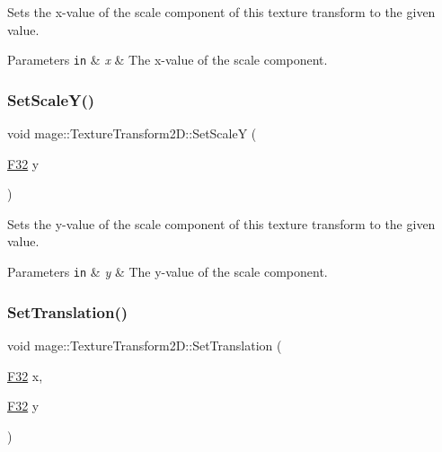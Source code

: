 Sets the x-\/value of the scale component of this texture transform to the given value.


\begin{DoxyParams}[1]{Parameters}
\mbox{\tt in}  & {\em x} & The x-\/value of the scale component. \\
\hline
\end{DoxyParams}
\mbox{\label{classmage_1_1_texture_transform2_d_a622785c804ceb47b59a399ec495ad41d}} 
\subsubsection{\texorpdfstring{Set\+Scale\+Y()}{SetScaleY()}}
{\footnotesize\ttfamily void mage\+::\+Texture\+Transform2\+D\+::\+Set\+ScaleY (\begin{DoxyParamCaption}\item[{\mbox{\hyperlink{namespacemage_aa97e833b45f06d60a0a9c4fc22ae02c0}{F32}}}]{y }\end{DoxyParamCaption})\hspace{0.3cm}{\ttfamily [noexcept]}}

Sets the y-\/value of the scale component of this texture transform to the given value.


\begin{DoxyParams}[1]{Parameters}
\mbox{\tt in}  & {\em y} & The y-\/value of the scale component. \\
\hline
\end{DoxyParams}
\mbox{\label{classmage_1_1_texture_transform2_d_a36f5af01ebcc7860e6fc7eac47448425}} 
\subsubsection{\texorpdfstring{Set\+Translation()}{SetTranslation()}\hspace{0.1cm}{\footnotesize\ttfamily [1/3]}}
{\footnotesize\ttfamily void mage\+::\+Texture\+Transform2\+D\+::\+Set\+Translation (\begin{DoxyParamCaption}\item[{\mbox{\hyperlink{namespacemage_aa97e833b45f06d60a0a9c4fc22ae02c0}{F32}}}]{x,  }\item[{\mbox{\hyperlink{namespacemage_aa97e833b45f06d60a0a9c4fc22ae02c0}{F32}}}]{y }\end{DoxyParamCaption})\hspace{0.3cm}{\ttfamily [noexcept]}}

